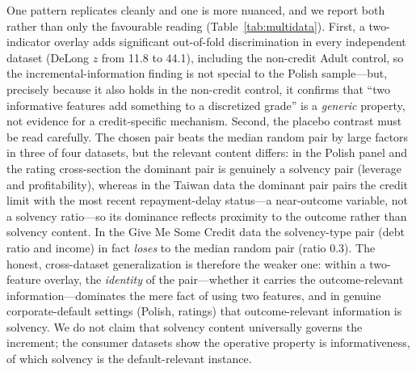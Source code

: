 \documentclass[pdflatex,sn-mathphys-ay]{sn-jnl}
\begin{document}
One pattern replicates cleanly and one is more nuanced, and we report both rather than only the
favourable reading (Table~\ref{tab:multidata}). First, a two-indicator overlay adds significant
out-of-fold discrimination in every independent dataset (DeLong $z$ from 11.8 to 44.1), including the
non-credit Adult control, so the incremental-information finding is not special to the Polish sample---but,
precisely because it also holds in the non-credit control, it confirms that ``two informative features
add something to a discretized grade'' is a \emph{generic} property, not evidence for a credit-specific
mechanism. Second, the placebo contrast must be read carefully. The chosen pair beats the median random
pair by large factors in three of four datasets, but the relevant content differs: in the Polish panel
and the rating cross-section the dominant pair is genuinely a solvency pair (leverage and profitability),
whereas in the Taiwan data the dominant pair pairs the credit limit with the most recent repayment-delay
status---a near-outcome variable, not a solvency ratio---so its dominance reflects proximity to the
outcome rather than solvency content. In the Give Me Some Credit data the solvency-type pair
(debt ratio and income) in fact \emph{loses} to the median random pair (ratio 0.3). The honest,
cross-dataset generalization is therefore the weaker one: within a two-feature overlay, the
\emph{identity} of the pair---whether it carries the outcome-relevant information---dominates the mere
fact of using two features, and in genuine corporate-default settings (Polish, ratings) that
outcome-relevant information is solvency. We do not claim that solvency content universally governs the
increment; the consumer datasets show the operative property is informativeness, of which solvency is
the default-relevant instance.
\end{document}
